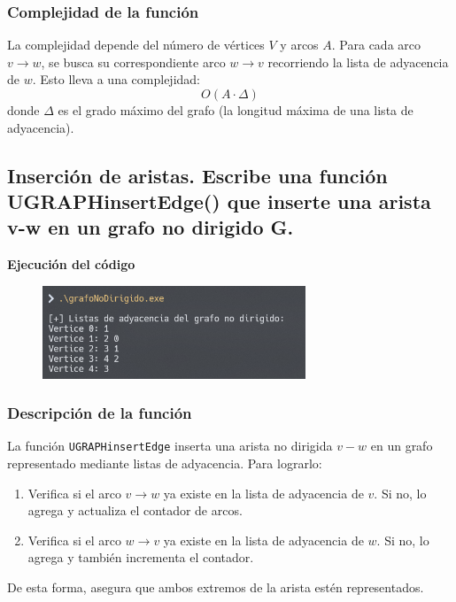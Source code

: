 \documentclass{article}
\begin{document}
        \subsubsection*{Complejidad de la función}
            La complejidad depende del número de vértices \( V \) y arcos \( A \). Para cada arco \( v \to w \), se busca su correspondiente arco \( w \to v \) recorriendo la lista de adyacencia de \( w \). Esto lleva a una complejidad:
            \[
            O(A \cdot \Delta)
            \]
            donde \( \Delta \) es el grado máximo del grafo (la longitud máxima de una lista de adyacencia).


    \subsection{Inserción de aristas. Escribe una función UGRAPHinsertEdge() que inserte una arista v-w en un grafo no dirigido G.}

        

        \textbf{Ejecución del código}
            \begin{figure}[H]
            	\centering
             	\includegraphics[width=0.7\textwidth,keepaspectratio]{img/exercise7.png}
            \end{figure}

        \subsubsection*{Descripción de la función}
            La función \texttt{UGRAPHinsertEdge} inserta una arista no dirigida \( v-w \) en un grafo representado mediante listas de adyacencia. Para lograrlo:
            \begin{enumerate}
                \item Verifica si el arco \( v \to w \) ya existe en la lista de adyacencia de \( v \). Si no, lo agrega y actualiza el contador de arcos.
                \item Verifica si el arco \( w \to v \) ya existe en la lista de adyacencia de \( w \). Si no, lo agrega y también incrementa el contador.
            \end{enumerate}
            De esta forma, asegura que ambos extremos de la arista estén representados.
            
\end{document}
